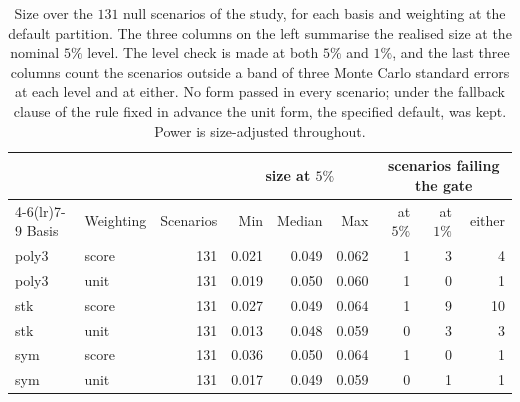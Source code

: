 \begin{table}[htbp]\centering\small
\caption{Size over the $131$ null scenarios of the study, for each basis and weighting at the
default partition. The three columns on the left summarise the realised size at the nominal $5\%$
level. The level check is made at both $5\%$ and $1\%$, and the last three columns
count the scenarios outside a band of three Monte Carlo standard errors at each level and at
either. No form passed in every scenario; under the fallback clause of the rule fixed in advance the
unit form, the specified default, was kept. Power is size-adjusted throughout.}
\label{tab:size}
\begin{tabular}{llrrrrrrr}\hline
 & & & \multicolumn{3}{c}{size at $5\%$} & \multicolumn{3}{c}{scenarios failing the gate} \\
\cmidrule(lr){4-6}\cmidrule(lr){7-9}
Basis & Weighting & Scenarios & Min & Median & Max & at $5\%$ & at $1\%$ & either \\ \hline
poly3 & score & 131 & 0.021 & 0.049 & 0.062 & 1 & 3 & 4 \\
poly3 & unit & 131 & 0.019 & 0.050 & 0.060 & 1 & 0 & 1 \\
stk & score & 131 & 0.027 & 0.049 & 0.064 & 1 & 9 & 10 \\
stk & unit & 131 & 0.013 & 0.048 & 0.059 & 0 & 3 & 3 \\
sym & score & 131 & 0.036 & 0.050 & 0.064 & 1 & 0 & 1 \\
sym & unit & 131 & 0.017 & 0.049 & 0.059 & 0 & 1 & 1 \\
\hline\end{tabular}\end{table}
